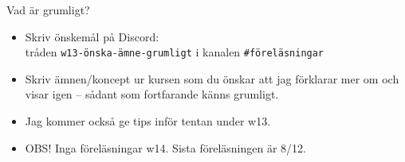 


\ifkompendium\else


\begin{SlideExtra}{Vad är grumligt?}\SlideFontSmall

\begin{itemize}
\item Skriv önskemål på Discord:\\ tråden \texttt{w13-önska-ämne-grumligt} i kanalen \texttt{\#föreläsningar}
\item  Skriv ämnen/koncept ur kursen som du önskar att jag förklarar mer om och visar igen -- sådant som fortfarande känns grumligt. 
\item Jag kommer också ge tips inför tentan under w13.  
\item OBS! Inga föreläsningar w14. Sista föreläsningen är 8/12.
\end{itemize}

\end{SlideExtra}


%
%

\fi